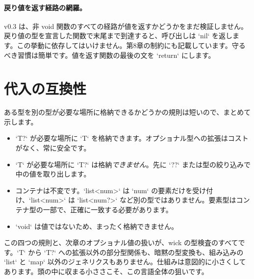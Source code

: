 \paragraph{戻り値を返す経路の網羅。} v0.3 は、非 void 関数のすべての経路が値を返すかどうかをまだ検証しません。戻り値の型を宣言した関数で末尾まで到達すると、呼び出しは `nil` を返します。この挙動に依存してはいけません。第8章の制約にも記載しています。守るべき習慣は簡単です。値を返す関数の最後の文を `return` にします。

\section{代入の互換性}

ある型を別の型が必要な場所に格納できるかどうかの規則は短いので、まとめて示します。

\begin{itemize}
\item `T?` が必要な場所に `T` を格納できます。オプショナル型への拡張はコストがなく、常に安全です。
\item `T` が必要な場所に `T?` は格納\emph{できません}。先に `??` または型の絞り込みで中の値を取り出します。
\item コンテナは不変です。`list<num>` は `num` の要素だけを受け付け、`list<num>` は `list<num?>` など別の型ではありません。要素型はコンテナ型の一部で、正確に一致する必要があります。
\item `void` は値ではないため、まったく格納できません。
\end{itemize}

\noindent
この四つの規則と、次章のオプショナル値の扱いが、wick の型検査のすべてです。`T` から `T?` への拡張以外の部分型関係も、暗黙の型変換も、組み込みの `list` と `map` 以外のジェネリクスもありません。仕組みは意図的に小さくしてあります。頭の中に収まる小ささこそ、この言語全体の狙いです。
